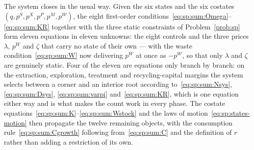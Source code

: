 The system closes in the usual way. Given the six states and the six costates $\left(q,p^S,p^X,p^P,p^M,p^{\mathcal W}\right)$, the eight first-order conditions~\eqref{eq:sp:sum:Omega}--\eqref{eq:sp:sum:KR} together with the three static constraints of Problem~\ref{prob:sp} form eleven equations in eleven unknowns: the eight controls and the three prices $\lambda$, $p^W$ and $\zeta$ that carry no state of their own --- with the waste condition~\eqref{eq:sp:sum:W} now delivering $p^W$ at once as $-p^{\mathcal W}$, so that only $\lambda$ and $\zeta$ are genuinely static. Four of the eleven are equations only branch by branch: on the extraction, exploration, treatment and recycling-capital margins the system selects between a corner and an interior root according to~\eqref{eq:sp:sum:Nsys}, \eqref{eq:sp:sum:Dsys}, \eqref{eq:sp:sum:varpi} and~\eqref{eq:sp:sum:KR}, which is one equation either way and is what makes the count work in every phase. The costate equations~\eqref{eq:sp:sum:K}--\eqref{eq:sp:sum:Wstock} and the laws of motion~\eqref{eq:sp:states-motion} then propagate the twelve remaining objects, with the consumption rule~\eqref{eq:sp:sum:Cgrowth} following from~\eqref{eq:sp:sum:C} and the definition of $r$ rather than adding a restriction of its own.

